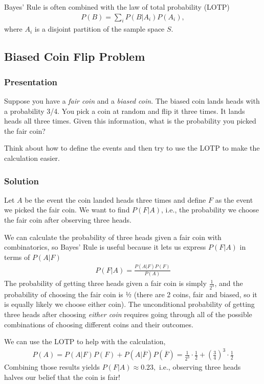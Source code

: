 \documentclass[11pt,a4paper]{article}
\begin{document}
Bayes' Rule is often combined with the law of total probability (LOTP)
\begin{align}
P(B) = \sum_{i}^{}{P\left( B | A_{i} \right)P(A_{i})},
\end{align}
where \(A_{i}\) is a disjoint partition of the sample space \(S\).

\subsection{Biased Coin Flip Problem}

\subsubsection{Presentation}

Suppose you have a \emph{fair coin} 
and a \emph{biased coin}. 
The biased coin lands heads with a probability 3/4. 
You pick a coin at random and flip it three times. 
It lands heads all three times. 
Given this information,
what is the probability you picked the fair coin?

Think about how to define the events and then try to use the LOTP to make the calculation easier.

\clearpage
\subsubsection{Solution}

Let \(A\) be the event the coin landed heads three times and define \(F\) as the event we picked the fair coin. 
We want to find \(P(F|A)\), i.e., the probability we choose the fair coin after observing three heads.

We can calculate the probability of three heads given a fair coin with combinatorics, 
so Bayes' Rule is useful because it lets us express \(P(F|A)\) in terms of \(P(A|F)\)
\begin{align}
P\left( F | A \right) = \frac{P\left( A | F \right)P(F)}{P(A)}
\end{align}
The probability of getting three heads given a fair coin is simply \(\frac{1}{2^{3}}\), 
and the probability of choosing the fair coin is ½ (there are 2 coins, fair and biased, 
so it is equally likely we choose either coin). 
The unconditional probability of getting three heads after choosing \emph{either coin} requires 
going through all of the possible combinations of choosing different coins and their outcomes.

We can use the LOTP to help with the calculation,
\begin{align}
P(A) = P\left( A | F \right)P(F) + P\left( A | \overline{F} \right)P\left( \overline{F} \right) = 
\frac{1}{2^{3}} \cdot \frac{1}{2} + \left( \frac{3}{4} \right)^{3} \cdot \frac{1}{2}
\end{align}
Combining those results yields
\(P\left( F | A \right) \approx 0.23,\) i.e., observing three heads
halves our belief that the coin is fair!
\end{document}

